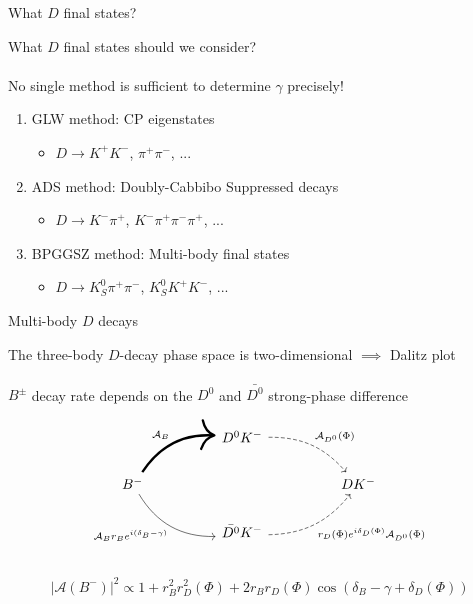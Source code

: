 \documentclass[dvipsnames]{beamer}
\begin{document}
\begin{frame}{What $D$ final states?}
  \begin{center}
    \Large What $D$ final states should we consider?\\~\\
    \Large No single method is sufficient to determine $\gamma$ precisely!
  \end{center}
  \vspace{0.2cm}
  \begin{enumerate}
    \setlength\itemsep{1.0em}
    \item{GLW method: CP eigenstates}
    \begin{itemize}
      \item{$D\to K^+K^-$, $\pi^+\pi^-$, ...}
    \end{itemize}
    \item{ADS method: Doubly-Cabbibo Suppressed decays}
    \begin{itemize}
      \item{$D\to K^-\pi^+$, $K^-\pi^+\pi^-\pi^+$, ...}
    \end{itemize}
    \item{BPGGSZ method: Multi-body final states}
    \begin{itemize}
      \item{$D\to K_S^0\pi^+\pi^-$, $K_S^0K^+K^-$, ...}
    \end{itemize}
  \end{enumerate}
\end{frame}

\begin{frame}[fragile]{Multi-body $D$ decays}
  \begin{center}
    The three-body $D$-decay phase space is two-dimensional $\implies$ Dalitz plot\\~\\
    $B^\pm$ decay rate depends on the $D^0$ and $\bar{D^0}$ strong-phase difference
  \end{center}
  \begin{equation*}
    \begin{tikzcd}[column sep=huge]
      & D^0K^- \arrow[dr, bend left = 25, dashed, "\mathcal{A}_{D^0}(\Phi)"] & \\
      B^- \arrow[ur, bend left, line width = 1.7, "\mathcal{A}_B"] \arrow[dr, bend right, "\mathcal{A}_B r_B e^{i(\delta_B - \gamma)}"'] & [5cm] & DK^- \\
      & \bar{D^0}K^- \arrow[ur, bend right = 25, dashed, "r_D(\Phi)e^{i\delta_D(\Phi)}\mathcal{A}_{D^0}(\Phi)"'] & \\
    \end{tikzcd}
  \end{equation*}
  \vspace{-0.5cm}
  \begin{equation*}
    \lvert\mathcal{A}(B^-)\lvert^2\propto1 + r_B^2r_D^2(\Phi) + 2r_Br_D(\Phi)\cos(\delta_B - \gamma + \delta_D(\Phi))
  \end{equation*}
\end{frame}
\end{document}
